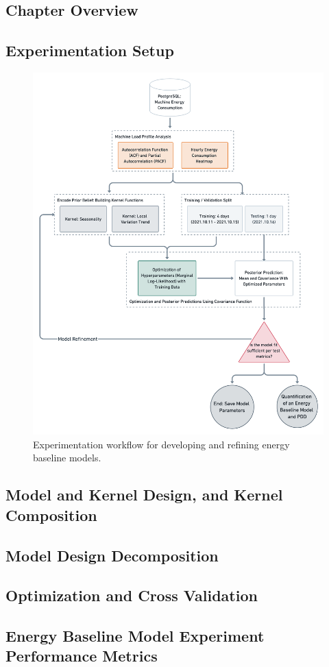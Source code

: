 \subsection{Chapter Overview}

\subsection{Experimentation Setup}

\begin{figure}[H]
\centering
\graphicspath{ {./images/} }
\includegraphics[scale=0.17]{images/experiment_flow.png}
\caption{Experimentation workflow for developing and refining energy baseline models.}
\end{figure}

\subsection{Model and Kernel Design, and Kernel Composition}

\subsection{Model Design Decomposition}

\subsection{Optimization and Cross Validation}

\subsection{Energy Baseline Model Experiment Performance Metrics}